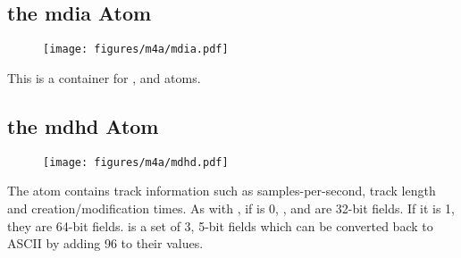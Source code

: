 \clearpage

\subsection{the mdia Atom}
\label{atom:mdia}
\begin{figure}[h]
  \texttt{[image: figures/m4a/mdia.pdf]}
\end{figure}
\par
\noindent
This is a container for \hyperref[atom:mdhd]{},
\hyperref[atom:hdlr]{} and
\hyperref[atom:minf]{} atoms.

\subsection{the mdhd Atom}
\label{atom:mdhd}
\begin{figure}[h]
\texttt{[image: figures/m4a/mdhd.pdf]}
\end{figure}
\par
\noindent
The  atom contains track information such as samples-per-second,
track length and creation/modification times.
As with , if  is 0, ,
 and  are 32-bit fields.
If it is 1, they are 64-bit fields.
 is a set of 3, 5-bit fields which can be converted
back to ASCII by adding 96 to their values.

\clearpage

